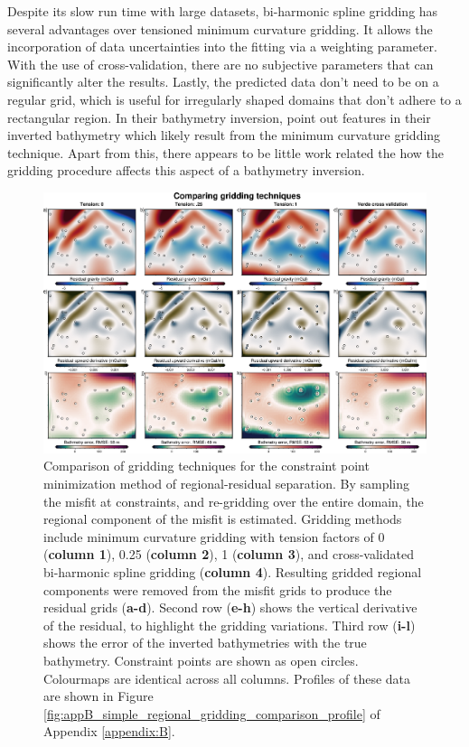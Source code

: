 Despite its slow run time with large datasets, bi-harmonic spline gridding has several advantages over tensioned minimum curvature gridding. It allows the incorporation of data uncertainties into the fitting via a weighting parameter. With the use of cross-validation, there are no subjective parameters that can significantly alter the results. Lastly, the predicted data don't need to be on a regular grid, which is useful for irregularly shaped domains that don't adhere to a rectangular region. In their bathymetry inversion, \citet{millanconstraining2020} point out features in their inverted bathymetry which likely result from the minimum curvature gridding technique. Apart from this, there appears to be little work related the how the gridding procedure affects this aspect of a bathymetry inversion.

\begin{figure}[!ht]
    \centering
    \includegraphics[width=1\textwidth]{figures/chp3/chp3_simple_regional_gridding_comparison.png}
    \caption[Constraint point minimization gridding techniques]{Comparison of gridding techniques for the constraint point minimization method of regional-residual separation. By sampling the misfit at constraints, and re-gridding over the entire domain, the regional component of the misfit is estimated. Gridding methods include minimum curvature gridding with tension factors of 0 (\textbf{column 1}), 0.25 (\textbf{column 2}), 1 (\textbf{column 3}), and cross-validated bi-harmonic spline gridding (\textbf{column 4}). Resulting gridded regional components were removed from the misfit grids to produce the residual grids (\textbf{a-d}). Second row (\textbf{e-h}) shows the vertical derivative of the residual, to highlight the gridding variations. Third row (\textbf{i-l}) shows the error of the inverted bathymetries with the true bathymetry. Constraint points are shown as open circles. Colourmaps are identical across all columns. Profiles of these data are shown in Figure \ref{fig:appB_simple_regional_gridding_comparison_profile} of Appendix \ref{appendix:B}.}
    \label{fig:chp3_simple_regional_gridding_comparison}
\end{figure}

